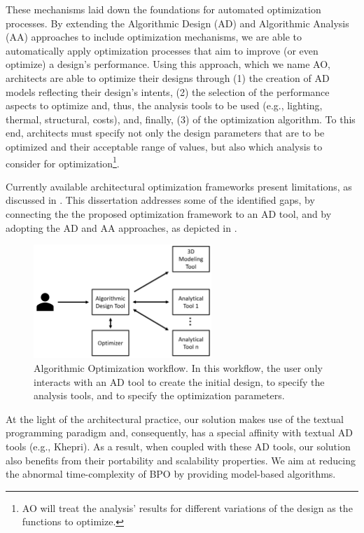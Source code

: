 These mechanisms laid down the foundations for automated optimization processes. By extending the Algorithmic Design (AD) and Algorithmic Analysis (AA) approaches to include optimization mechanisms, we are able to automatically apply optimization processes that aim to improve (or even optimize) a design’s performance. Using this approach, which we name \ac{AO}, architects are able to optimize their designs through (1) the creation of \ac{AD} models reflecting their design's intents, (2) the selection of the performance aspects to optimize and, thus, the analysis tools to be used (e.g., lighting, thermal, structural, costs), and, finally, (3) of the optimization algorithm. To this end, architects must specify not only the design parameters that are to be optimized and their acceptable range of values, but also which analysis to consider for optimization\footnote{\ac{AO} will treat the analysis' results for different variations of the design as the functions to optimize.}. 

Currently available architectural optimization frameworks present limitations, as discussed in . This dissertation addresses some of the identified gaps, by connecting the the proposed optimization framework to an \ac{AD} tool, and by adopting the \ac{AD} and \ac{AA} approaches, as depicted in . 

\begin{figure}[htbp]
	\centering
	\includegraphics[width=0.6\textwidth]{./Images/Solution/algorithmic_optimization.png}
	\caption{Algorithmic Optimization workflow. In this workflow, the user only interacts with an \ac{AD} tool to create the initial design, to specify the analysis tools, and to specify the optimization parameters.}
	\label{fig:algorithmicoptimization}
\end{figure}




At the light of the architectural practice, our solution makes use of the textual programming paradigm and, consequently, has a special affinity with textual \ac{AD} tools (e.g., Khepri). As a result, when coupled with these \ac{AD} tools, our solution also benefits from their portability and scalability properties. We aim at reducing the abnormal time-complexity of \ac{BPO} by providing model-based algorithms. 

